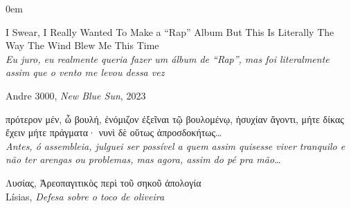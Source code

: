 {
\small
\vspace*{\fill}
\OnehalfSpacing%
\begin{addmargin}[0.52\textwidth]{0em}


	\begin{flushleft}
		I Swear, I Really Wanted To Make a ``Rap'' Album But This Is Literally The Way The
		Wind Blew Me This Time\\
		\textit{Eu juro, eu realmente queria fazer um álbum de ``Rap'', mas foi
			literalmente assim que o vento me levou dessa vez}
		\smallskip

		Andre 3000, \emph{New Blue Sun}, 2023

		\vspace{1cm}

		πρότερον μέν, ὦ βουλή, ἐνόμιζον ἐξεῖναι τῷ βουλομένῳ, ἡσυχίαν ἄγοντι,
		μήτε δίκας ἔχειν μήτε πράγματα· νυνὶ δὲ οὕτως ἀπροσδοκήτως\ldots{}\\
		\textit{Antes, ó assembleia, julguei ser possível a quem assim
			quisesse viver tranquilo e não ter arengas ou problemas, mas agora,
			assim do pé pra mão\ldots{}}
		\smallskip

		Λυσίας,
		Ἀρεοπαγιτικὸς περὶ τοῦ σηκοῦ ἀπολογία\\
		Lísias, \emph{Defesa sobre o toco de oliveira}
	\end{flushleft}
\end{addmargin}
\vspace{1.5cm}
}
